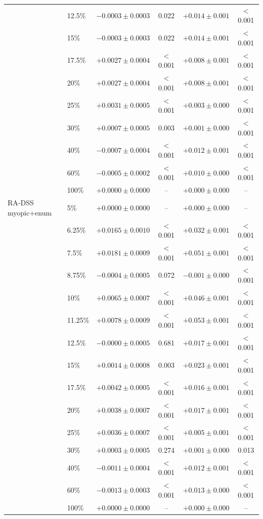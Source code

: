 \begin{tabular}{llcccc}
 & 12.5\% & $-0.0003\pm0.0003$ & 0.022 & $+0.014\pm0.001$ & $<$0.001 \\
 & 15\% & $-0.0003\pm0.0003$ & 0.022 & $+0.014\pm0.001$ & $<$0.001 \\
 & 17.5\% & $+0.0027\pm0.0004$ & $<$0.001 & $+0.008\pm0.001$ & $<$0.001 \\
 & 20\% & $+0.0027\pm0.0004$ & $<$0.001 & $+0.008\pm0.001$ & $<$0.001 \\
 & 25\% & $+0.0031\pm0.0005$ & $<$0.001 & $+0.003\pm0.000$ & $<$0.001 \\
 & 30\% & $+0.0007\pm0.0005$ & 0.003 & $+0.001\pm0.000$ & $<$0.001 \\
 & 40\% & $-0.0007\pm0.0004$ & $<$0.001 & $+0.012\pm0.001$ & $<$0.001 \\
 & 60\% & $-0.0005\pm0.0002$ & $<$0.001 & $+0.010\pm0.000$ & $<$0.001 \\
 & 100\% & $+0.0000\pm0.0000$ & -- & $+0.000\pm0.000$ & -- \\
\midrule
RA-DSS myopic+enum & 5\% & $+0.0000\pm0.0000$ & -- & $+0.000\pm0.000$ & -- \\
 & 6.25\% & $+0.0165\pm0.0010$ & $<$0.001 & $+0.032\pm0.001$ & $<$0.001 \\
 & 7.5\% & $+0.0181\pm0.0009$ & $<$0.001 & $+0.051\pm0.001$ & $<$0.001 \\
 & 8.75\% & $-0.0004\pm0.0005$ & 0.072 & $-0.001\pm0.000$ & $<$0.001 \\
 & 10\% & $+0.0065\pm0.0007$ & $<$0.001 & $+0.046\pm0.001$ & $<$0.001 \\
 & 11.25\% & $+0.0078\pm0.0009$ & $<$0.001 & $+0.053\pm0.001$ & $<$0.001 \\
 & 12.5\% & $-0.0000\pm0.0005$ & 0.681 & $+0.017\pm0.001$ & $<$0.001 \\
 & 15\% & $+0.0014\pm0.0008$ & 0.003 & $+0.023\pm0.001$ & $<$0.001 \\
 & 17.5\% & $+0.0042\pm0.0005$ & $<$0.001 & $+0.016\pm0.001$ & $<$0.001 \\
 & 20\% & $+0.0038\pm0.0007$ & $<$0.001 & $+0.017\pm0.001$ & $<$0.001 \\
 & 25\% & $+0.0036\pm0.0007$ & $<$0.001 & $+0.005\pm0.001$ & $<$0.001 \\
 & 30\% & $+0.0003\pm0.0005$ & 0.274 & $+0.001\pm0.000$ & 0.013 \\
 & 40\% & $-0.0011\pm0.0004$ & $<$0.001 & $+0.012\pm0.001$ & $<$0.001 \\
 & 60\% & $-0.0013\pm0.0003$ & $<$0.001 & $+0.013\pm0.000$ & $<$0.001 \\
 & 100\% & $+0.0000\pm0.0000$ & -- & $+0.000\pm0.000$ & -- \\

\end{tabular}

